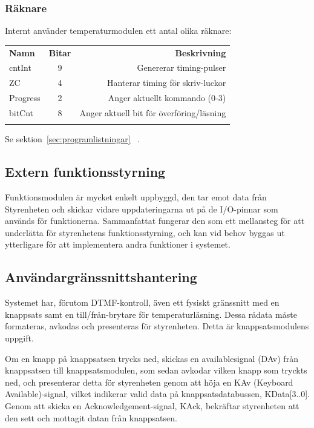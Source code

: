 \documentclass[a4paper,11pt]{article}
\begin{document}
	\subsubsection{Räknare}

	Internt använder temperaturmodulen ett antal olika räknare: \\
		\begin{tabular}{l c r}
			\\{\bf Namn} & {\bf Bitar} & {\bf Beskrivning}\\
			cntInt & 9 & Genererar timing-pulser\\
			ZC & 4 & Hanterar timing för skriv-luckor\\
			Progress & 2 & Anger aktuellt kommando (0-3)\\
			bitCnt & 8 & Anger aktuell bit för överföring/läsning\\\\
		\end{tabular}

	Se sektion~\ref{sec:programlistningar} ~.

	\subsection{Extern funktionsstyrning}

Funktionsmodulen är mycket enkelt uppbyggd, den tar emot data från Styrenheten och skickar vidare 
uppdateringarna ut på de I/O-pinnar som används för funktionerna. Sammanfattat fungerar den som ett
mellansteg för att underlätta för styrenhetens funktionsstyrning, och kan vid behov byggas ut ytterligare
för att implementera andra funktioner i systemet.

	\subsection{Användargränssnittshantering}

Systemet har, förutom DTMF-kontroll, även ett fysiskt gränssnitt med en knappsats samt en till/från-brytare för temperaturläsning.
Dessa rådata måste formateras, avkodas och presenteras för styrenheten. Detta är knappsatsmodulens uppgift.

Om en knapp på knappsatsen trycks ned, skickas en availablesignal (DAv) från knappsatsen till knappsatsmodulen, som sedan
avkodar vilken knapp som tryckts ned, och presenterar detta för styrenheten genom att höja en KAv (Keyboard Available)-signal,
vilket indikerar valid data på knappsatsdatabussen, KData[3..0]. Genom att skicka en Acknowledgement-signal, KAck, bekräftar 
styrenheten att den sett och mottagit datan från knappsatsen.
\end{document}
